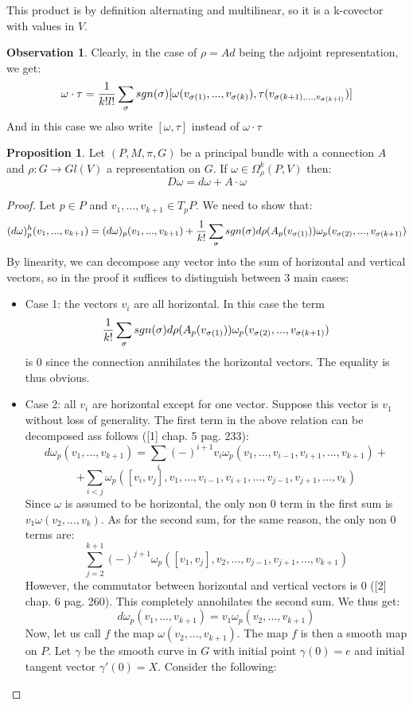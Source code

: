 \documentclass[12pt,a4paper]{report}
\theoremstyle{definition}
\theoremstyle{Theorem}
\newtheorem{Prop}[Def]{Proposition}
\theoremstyle{definition}
\theoremstyle{definition}
\newtheorem{Obs}[Def]{Observation}
\begin{document}
	This product is by definition alternating and multilinear, so it is a k-covector with values in $V$.
	\begin{Obs}
		Clearly, in the case of $\rho=Ad$ being the adjoint representation, we get:
		$$\omega\cdot \tau={1\over k!l!}\sum_\sigma sgn(\sigma)[\omega(v_{\sigma(1)},...,v_{\sigma(k)}),\tau(v_{\sigma(k+1),...,v_{\sigma(k+l)}})]$$
		And in this case we also write $[\omega,\tau]$ instead of $\omega\cdot \tau$
	\end{Obs}
	\begin{Prop}\label{Prop_6.3.4}
		Let $(P,M,\pi,G)$ be a principal bundle with a connection $A$ and $\rho:G\rightarrow Gl(V)$ a representation on $G$. If $\omega\in\Omega^k_\rho(P,V)$ then:
		$$D\omega=d\omega+A\cdot \omega$$
	\end{Prop}
	\begin{proof}
		Let $p\in P$ and $v_1,...,v_{k+1}\in T_pP$. We need to show that:
		$$(d\omega)^h_p(v_1,...,v_{k+1})=(d\omega)_p(v_1,...,v_{k+1})+{1\over k!}\sum_\sigma sgn(\sigma)d\rho(A_p(v_{\sigma(1)}))\omega_p(v_{\sigma(2)},...,v_{\sigma(k+1)})$$
		By linearity, we can decompose any vector into the sum of horizontal and vertical vectors, so in the proof it suffices to distinguish between 3 main cases:
		\begin{itemize}
			\item Case 1: the vectors $v_i$ are all horizontal. In this case the term 
			$${1\over k!}\sum_\sigma sgn(\sigma)d\rho(A_p(v_{\sigma(1)}))\omega_p(v_{\sigma(2)},...,v_{\sigma(k+1)})$$
			is 0 since the connection annihilates the horizontal vectors. The equality is thus obvious.
			\item Case 2: all $v_i$ are horizontal except for one vector. Suppose this vector is $v_1$ without loss of generality. The first term in the above relation can be decomposed ass follows ([1] chap. 5 pag. 233): 
			$$d\omega_p(v_1,...,v_{k+1})=\sum_i (-)^{i+1}v_i\omega_p(v_1,...,v_{i-1},v_{i+1},...,v_{k+1})+$$
			$$+\sum_{i<j}\omega_p([v_i,v_j],v_1,...,v_{i-1},v_{i+1},...,v_{j-1},v_{j+1},...,v_k)$$
			Since $\omega$ is assumed to be horizontal, the only non 0 term in the first sum is $v_1\omega(v_2,...,v_k)$. As for the second sum, for the same reason, the only non 0 terms are:
			$$\sum_{j=2}^{k+1}(-)^{j+1}\omega_p([v_1,v_j],v_2,...,v_{j-1},v_{j+1},...,v_{k+1})$$
			However, the commutator between horizontal and vertical vectors is 0 ([2] chap. 6 pag. 260). This completely annohilates the second sum. We thus get:
			$$d\omega_p(v_1,...,v_{k+1})=v_1\omega_p(v_2,...,v_{k+1})$$
			Now, let us call $f$ the map $\omega(v_2,...,v_{k+1})$. The map $f$ is then a smooth map on $P$. Let $\gamma$ be the smooth curve in $G$ with initial point $\gamma(0)=e$ and initial tangent vector $\gamma'(0)=X$. Consider the following:

\end{itemize}
\end{proof}
\end{document}
